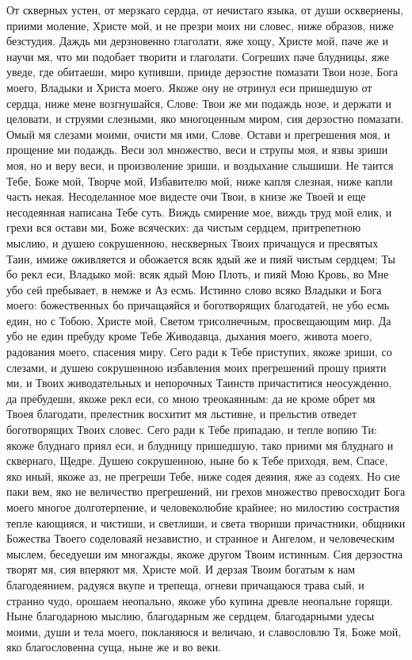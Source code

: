 От скверных устен, от мерзкаго сердца, от нечистаго языка, от души осквернены, приими моление, Христе мой, и не презри моих ни словес, ниже образов, ниже безстудия. Даждь ми дерзновенно глаголати, яже хощу, Христе мой, паче же и научи мя, что ми подобает творити и глаголати. Согреших паче блудницы, яже уведе, где обитаеши, миро купивши, прииде дерзостне помазати Твои нозе, Бога моего, Владыки и Христа моего. Якоже ону не отринул еси пришедшую от сердца, ниже мене возгнушайся, Слове: Твои же ми подаждь нозе, и держати и целовати, и струями слезными, яко многоценным миром, сия дерзостно помазати. Омый мя слезами моими, очисти мя ими, Слове. Остави и прегрешения моя, и прощение ми подаждь. Веси зол множество, веси и струпы моя, и язвы зриши моя, но и веру веси, и произволение зриши, и воздыхание слышиши. Не таится Тебе, Боже мой, Творче мой, Избавителю мой, ниже капля слезная, ниже капли часть некая. Несоделанное мое видесте очи Твои, в книзе же Твоей и еще несодеянная написана Тебе суть. Виждь смирение мое, виждь труд мой елик, и грехи вся остави ми, Боже всяческих: да чистым сердцем, притрепетною мыслию, и душею сокрушенною, нескверных Твоих причащуся и пресвятых Таин, имиже оживляется и обожается всяк ядый же и пияй чистым сердцем; Ты бо рекл еси, Владыко мой: всяк ядый Мою Плоть, и пияй Мою Кровь, во Мне убо сей пребывает, в немже и Аз есмь. Истинно слово всяко Владыки и Бога моего: божественных бо причащаяйся и боготворящих благодатей, не убо есмь един, но с Тобою, Христе мой, Светом трисолнечным, просвещающим мир. Да убо не един пребуду кроме Тебе Живодавца, дыхания моего, живота моего, радования моего, спасения миру. Сего ради к Тебе приступих, якоже зриши, со слезами, и душею сокрушенною избавления моих прегрешений прошу прияти ми, и Твоих живодательных и непорочных Таинств причаститися неосужденно, да пребудеши, якоже рекл еси, со мною треокаянным: да не кроме обрет мя Твоея благодати, прелестник восхитит мя льстивне, и прельстив отведет боготворящих Твоих словес. Сего ради к Тебе припадаю, и тепле вопию Ти: якоже блуднаго приял еси, и блудницу пришедшую, тако приими мя блуднаго и сквернаго, Щедре. Душею сокрушенною, ныне бо к Тебе приходя, вем, Спасе, яко иный, якоже аз, не прегреши Тебе, ниже содея деяния, яже аз содеях. Но сие паки вем, яко не величество прегрешений, ни грехов множество превосходит Бога моего многое долготерпение, и человеколюбие крайнее; но милостию сострастия тепле кающияся, и чистиши, и светлиши, и света твориши причастники, общники Божества Твоего соделоваяй независтно, и странное и Ангелом, и человеческим мыслем, беседуеши им многажды, якоже другом Твоим истинным. Сия дерзостна творят мя, сия вперяют мя, Христе мой. И дерзая Твоим богатым к нам благодеянием, радуяся вкупе и трепеща, огневи причащаюся трава сый, и странно чудо, орошаем неопально, якоже убо купина древле неопальне горящи. Ныне благодарною мыслию, благодарным же сердцем, благодарными удесы моими, души и тела моего, покланяюся и величаю, и славословлю Тя, Боже мой, яко благословенна суща, ныне же и во веки.


